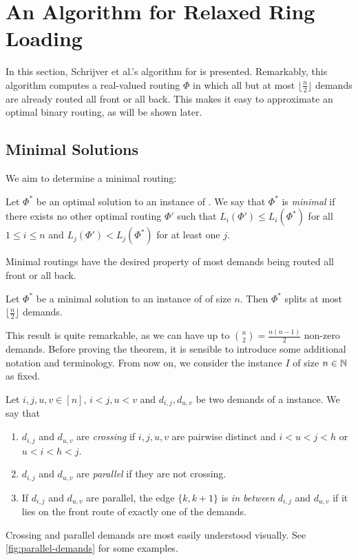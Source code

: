 \section{An Algorithm for Relaxed Ring Loading}
\label{sec:relaxed-ring-loading}

In this section, Schrijver et al.'s \cite{schrijver99} algorithm for \RRL is presented.
Remarkably, this algorithm computes a real-valued routing $\Phi$ in which all but at most $\lfloor \frac{n}{2} \rfloor$ demands are already routed all front or all back.
This makes it easy to approximate an optimal binary routing, as will be shown later.

\subsection{Minimal Solutions}

We aim to determine a minimal routing:

\begin{definition}
	Let $\Phi^\ast$ be an optimal solution to an instance of \RRL.
	We say that $\Phi^\ast$ is \emph{minimal} if there exists no other optimal routing $\Phi'$ such that $L_i(\Phi') \leq L_i(\Phi^\ast)$ for all $1 \leq i \leq n$ and $L_j(\Phi') < L_j(\Phi^\ast)$ for at least one $j$.
\end{definition}

Minimal routings have the desired property of most demands being routed all front or all back.
\begin{theorem}
	\label{theo:number-of-splits}
	Let $\Phi^\ast$ be a minimal solution to an instance of \RRL of size $n$.
	Then $\Phi^\ast$ splits at most $\lfloor \frac{n}{2} \rfloor$ demands.
\end{theorem}

This result is quite remarkable, as we can have up to $\binom{n}{2} = \frac{n(n-1)}{2}$ non-zero demands.
Before proving the theorem, it is sensible to introduce some additional notation and terminology.
From now on, we consider the \RRL instance $I$ of size $n \in \mathbb{N}$ as fixed.
\begin{definition}
	Let $i, j, u, v \in [n]$, $i < j, u < v$ and $d_{i,j}, d_{u, v}$ be two demands of a \RRL instance.
	We say that
	\begin{enumerate}
		\item $d_{i, j}$ and $d_{u, v}$ are \emph{crossing} if $i, j, u, v$ are pairwise distinct and $i < u < j < h$ or $u < i < h < j$.
		\item $d_{i, j}$ and $d_{u, v}$ are \emph{parallel} if they are not crossing.
		\item If $d_{i, j}$ and $d_{u, v}$ are parallel, the edge $\{k, k+1\}$ is \emph{in between}
		$d_{i,j}$ and $d_{u, v}$ if it lies on the front route of exactly one of the demands.
	\end{enumerate}
\end{definition}
Crossing and parallel demands are most easily understood visually.
See \cref{fig:parallel-demands} for some examples.

